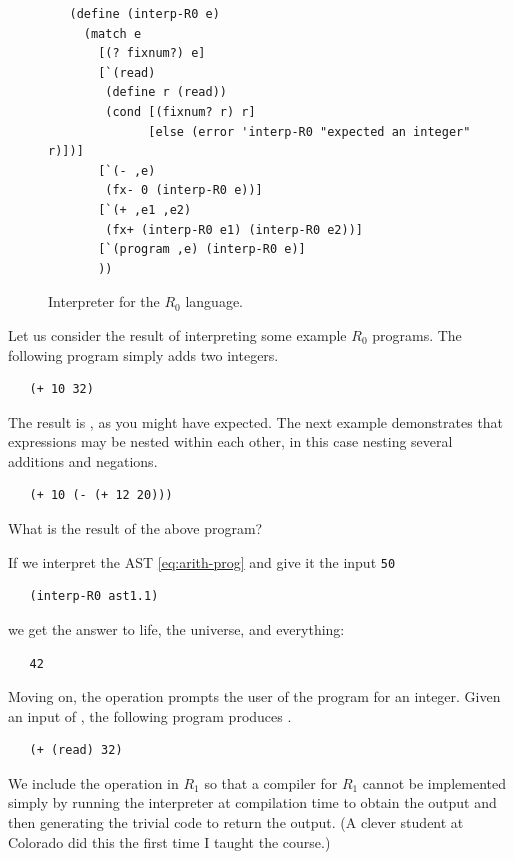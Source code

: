 \documentclass[11pt]{book}
\begin{document}
\begin{figure}[tbp]
\begin{lstlisting}
   (define (interp-R0 e)
     (match e
       [(? fixnum?) e]
       [`(read)
        (define r (read))
        (cond [(fixnum? r) r]
              [else (error 'interp-R0 "expected an integer" r)])]
       [`(- ,e)
        (fx- 0 (interp-R0 e))]
       [`(+ ,e1 ,e2)
        (fx+ (interp-R0 e1) (interp-R0 e2))]
       [`(program ,e) (interp-R0 e)]
       ))
\end{lstlisting}
\caption{Interpreter for the $R_0$ language.}
\label{fig:interp-R0}
\end{figure}

Let us consider the result of interpreting some example $R_0$
programs. The following program simply adds two integers.
\begin{lstlisting}
   (+ 10 32)
\end{lstlisting}
The result is , as you might have expected. 
%
The next example demonstrates that expressions may be nested within
each other, in this case nesting several additions and negations.
\begin{lstlisting}
   (+ 10 (- (+ 12 20)))
\end{lstlisting}
What is the result of the above program?

If we interpret the AST \eqref{eq:arith-prog} and give it the input
\texttt{50}
\begin{lstlisting}
   (interp-R0 ast1.1)
\end{lstlisting}
we get the answer to life, the universe, and everything:
\begin{lstlisting}
   42
\end{lstlisting}

Moving on, the  operation prompts the user of the program
for an integer. Given an input of , the following program
produces .
\begin{lstlisting}
   (+ (read) 32)
\end{lstlisting}
We include the  operation in $R_1$ so that a compiler for
$R_1$ cannot be implemented simply by running the interpreter at
compilation time to obtain the output and then generating the trivial
code to return the output. (A clever student at Colorado did this the
first time I taught the course.)
\end{document}
